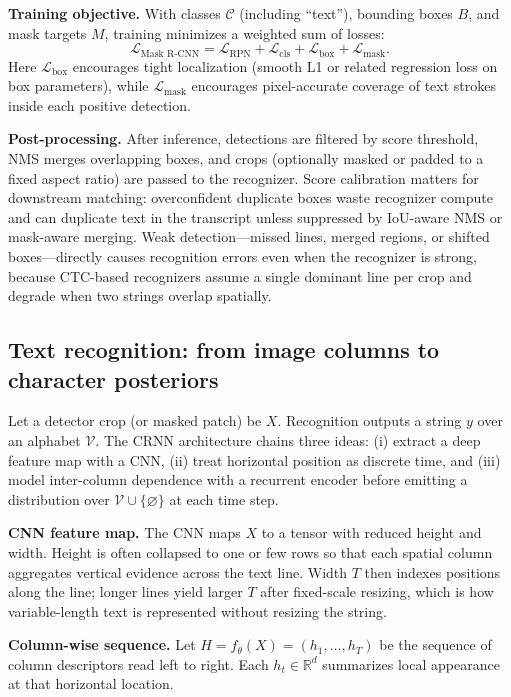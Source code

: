 \documentclass[11pt, a4paper]{article}
\newcommand{\Reals}{\mathbb{R}}
\begin{document}
\textbf{Training objective.} With classes $\mathcal{C}$ (including ``text''), bounding boxes $B$, and mask targets $M$, training minimizes a weighted sum of losses:
\[
\mathcal{L}_{\text{Mask R-CNN}}
= \mathcal{L}_{\text{RPN}} + \mathcal{L}_{\text{cls}} + \mathcal{L}_{\text{box}} + \mathcal{L}_{\text{mask}}.
\]
Here $\mathcal{L}_{\text{box}}$ encourages tight localization (smooth L1 or related regression loss on box parameters), while $\mathcal{L}_{\text{mask}}$ encourages pixel-accurate coverage of text strokes inside each positive detection.

\textbf{Post-processing.} After inference, detections are filtered by score threshold, NMS merges overlapping boxes, and crops (optionally masked or padded to a fixed aspect ratio) are passed to the recognizer. Score calibration matters for downstream matching: overconfident duplicate boxes waste recognizer compute and can duplicate text in the transcript unless suppressed by IoU-aware NMS or mask-aware merging. Weak detection---missed lines, merged regions, or shifted boxes---directly causes recognition errors even when the recognizer is strong, because CTC-based recognizers assume a single dominant line per crop and degrade when two strings overlap spatially.

\subsection{Text recognition: from image columns to character posteriors}
Let a detector crop (or masked patch) be $X$. Recognition outputs a string $y$ over an alphabet $\mathcal{V}$. The CRNN architecture \cite{shi2016crnn} chains three ideas: (i) extract a deep feature map with a CNN, (ii) treat horizontal position as discrete time, and (iii) model inter-column dependence with a recurrent encoder before emitting a distribution over $\mathcal{V} \cup \{\varnothing\}$ at each time step.

\textbf{CNN feature map.} The CNN maps $X$ to a tensor with reduced height and width. Height is often collapsed to one or few rows so that each spatial column aggregates vertical evidence across the text line. Width $T$ then indexes positions along the line; longer lines yield larger $T$ after fixed-scale resizing, which is how variable-length text is represented without resizing the string.

\textbf{Column-wise sequence.} Let $H = f_{\theta}(X) = (h_1,\ldots,h_T)$ be the sequence of column descriptors read left to right. Each $h_t \in \Reals^d$ summarizes local appearance at that horizontal location.
\end{document}
